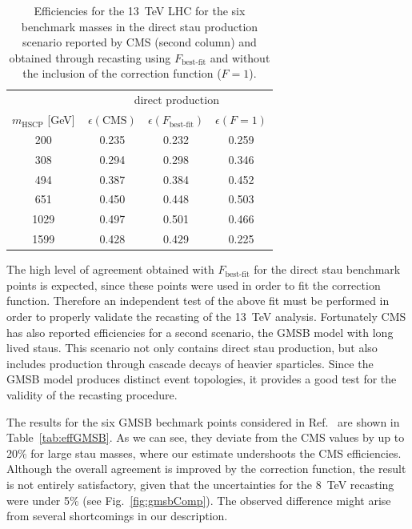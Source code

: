 \begin{table}[t]
\footnotesize
 \begin{center}
\begin{tabular}{c|ccc}
 & \multicolumn{3}{c}{direct production } \\
$m_\text{HSCP}$ [{\rm GeV}] & \,$\epsilon(\text{CMS})$ & $\epsilon(F_\text{best-fit})$& $\epsilon(F=1)$ \\
\hline
200   & \,0.235 & 0.232 & 0.259  \\
308   & \,0.294 & 0.298  & 0.346  \\
494    & \,0.387 & 0.384  & 0.452  \\
651  & \,0.450  & 0.448   & 0.503 \\
1029 & \,0.497 & 0.501  & 0.466 \\
1599 & \,0.428 & 0.429  & 0.225  \\
\hline
\end{tabular}
\end{center}
\caption{Efficiencies for the 13~TeV LHC for the six benchmark masses in the direct stau production scenario
reported by CMS (second column) and obtained through recasting using
$F_\text{best-fit}$ and without the inclusion of the correction function ($F=1$).}
\label{tab:eff}
\end{table}

The high level of agreement obtained with $F_\text{best-fit}$
for the direct stau benchmark points is expected, since these points
were used in order to fit the correction function.
Therefore an independent test of the above fit
must be performed in order to properly validate the recasting of
the 13~TeV analysis.
Fortunately CMS has also reported efficiencies for a second scenario,
the GMSB model with long lived staus. This scenario not
only contains direct stau production, but also includes production
through cascade decays of heavier sparticles.
Since the GMSB model produces distinct event topologies, it
provides a good test for the validity of the recasting
procedure.

The results for the six GMSB bechmark points considered in
Ref.~\cite{CMS-PAS-EXO-16-036} are shown in Table~\ref{tab:effGMSB}. As we can
see, they deviate from the CMS values by up to 20\% for large
stau masses, where our estimate undershoots the CMS efficiencies.
Although the overall agreement is improved by the correction function,
the result is not entirely satisfactory, given that
the uncertainties for the 8~TeV recasting were
under 5\% (see Fig.~\ref{fig:gmsbComp}).
The observed difference might arise from several shortcomings in our description.

